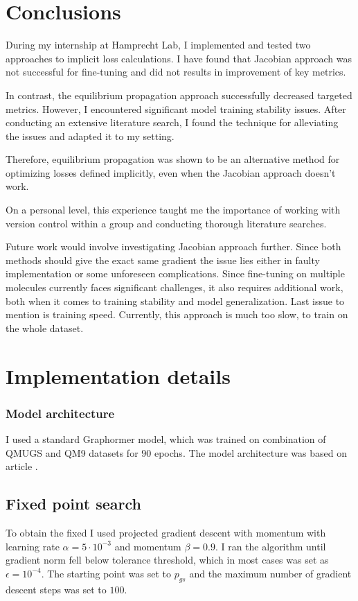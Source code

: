 \documentclass[a4paper,10.5pt]{report}
\begin{document}
\clearpage
\section{Conclusions}
During my internship at Hamprecht Lab, I implemented and tested two approaches to implicit loss calculations. I have found that Jacobian approach was not successful for fine-tuning and did not results in improvement of key metrics.

In contrast, the equilibrium propagation approach successfully decreased targeted metrics. However, I encountered significant model training stability issues. After conducting an extensive literature search, I found the technique for alleviating the issues and adapted it to my setting.

Therefore, equilibrium propagation was shown to be an alternative method for optimizing losses defined implicitly, even when the Jacobian approach doesn't work.

On a personal level, this experience taught me the importance of working with version control within a group and conducting thorough literature searches.

Future work would involve investigating Jacobian approach further. Since both methods should give the exact same gradient the issue lies either in faulty implementation or some unforeseen complications.
Since fine-tuning on multiple molecules currently faces significant challenges, it also requires additional work, both when it comes to training stability and model generalization.
Last issue to mention is training speed. Currently, this approach is much too slow, to train on the whole dataset.

\nocite{*}





\appendix
\section{Implementation details} \label{sec:impl}

\subsubsection{Model architecture}
I used a standard Graphormer model, which was trained on combination of QMUGS and QM9 datasets for $90$ epochs. The model architecture was based on article \cite{zhang2024overcoming}.

\subsection{Fixed point search}
To obtain the fixed I used projected gradient descent with momentum with learning rate $\alpha = 5\cdot 10^{-3}$ and momentum $\beta = 0.9$. I ran the algorithm until gradient norm fell below tolerance threshold, which in most cases was set as $\epsilon = 10^{-4}$. The starting point was set to $p_{gs}$ and the maximum number of gradient descent steps was set to $100$.
\end{document}

